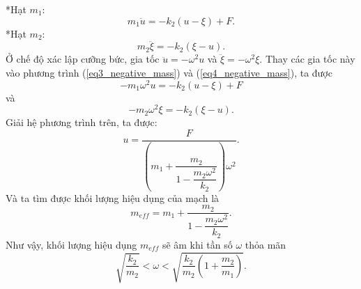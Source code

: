 \begin{enumerate}
*Hạt $m_1$:
\begin{equation} \label{eq5_negative_mass}
    m_1 \ddot{u} = -k_2 ( u - \xi) + F.
\end{equation}
*Hạt $m_2$:
\begin{equation} \label{eq6_negative_mass}
    m_2 \ddot{\xi} = - k_2 (\xi - u).
\end{equation}
Ở chế độ xác lập cưỡng bức, gia tốc $\ddot{u}=-\omega^2 u$ và $\ddot{\xi} = -\omega^2 \xi$. Thay các gia tốc này vào phương trình (\ref{eq3_negative_mass}) và (\ref{eq4_negative_mass}), ta được
\begin{equation} \label{eq7_negative_mass}
    - m_1 \omega^2 u = -k_2 (u-\xi) + F
\end{equation}
và
\begin{equation} \label{eq8_negative_mass}
    - m_2 \omega^2 \xi = -k_2 (\xi-u).
\end{equation}
Giải hệ phương trình trên, ta được:
\begin{equation} \label{eq9_negative_mass}
    u = \dfrac{F}{ \left( m_1 + \dfrac{m_2}{1 - \dfrac{m_2 \omega^2}{k_2}} \right) \omega^2}.
\end{equation}
Và ta tìm được khối lượng hiệu dụng của mạch là
\begin{equation} \label{eq10_negative_mass}
    m_{eff} = m_1 + \dfrac{m_2}{1 - \dfrac{m_2 \omega^2}{k_2}}.
\end{equation}
Như vậy, khối lượng hiệu dụng $m_{eff}$ sẽ âm khi tần số $\omega$ thỏa mãn
\begin{equation} \label{eq11_negative_mass}
    \sqrt{\dfrac{k_2}{m_2}} < \omega < \sqrt{\dfrac{k_2}{m_2} \left( 1 + \dfrac{m_2}{m_1} \right)}.
\end{equation}
\end{enumerate}


